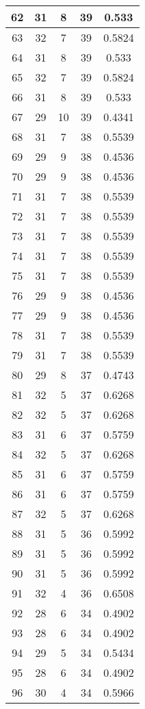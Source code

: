 \documentclass[letterpaper, 12pt]{article}
\begin{document}
\begin{longtable}{|c|c|c|c|c|}
\hline
62 & 31 & 8 & 39 & 0.533 \\
\hline
63 & 32 & 7 & 39 & 0.5824 \\
\hline
64 & 31 & 8 & 39 & 0.533 \\
\hline
65 & 32 & 7 & 39 & 0.5824 \\
\hline
66 & 31 & 8 & 39 & 0.533 \\
\hline
67 & 29 & 10 & 39 & 0.4341 \\
\hline
68 & 31 & 7 & 38 & 0.5539 \\
\hline
69 & 29 & 9 & 38 & 0.4536 \\
\hline
70 & 29 & 9 & 38 & 0.4536 \\
\hline
71 & 31 & 7 & 38 & 0.5539 \\
\hline
72 & 31 & 7 & 38 & 0.5539 \\
\hline
73 & 31 & 7 & 38 & 0.5539 \\
\hline
74 & 31 & 7 & 38 & 0.5539 \\
\hline
75 & 31 & 7 & 38 & 0.5539 \\
\hline
76 & 29 & 9 & 38 & 0.4536 \\
\hline
77 & 29 & 9 & 38 & 0.4536 \\
\hline
78 & 31 & 7 & 38 & 0.5539 \\
\hline
79 & 31 & 7 & 38 & 0.5539 \\
\hline
80 & 29 & 8 & 37 & 0.4743 \\
\hline
81 & 32 & 5 & 37 & 0.6268 \\
\hline
82 & 32 & 5 & 37 & 0.6268 \\
\hline
83 & 31 & 6 & 37 & 0.5759 \\
\hline
84 & 32 & 5 & 37 & 0.6268 \\
\hline
85 & 31 & 6 & 37 & 0.5759 \\
\hline
86 & 31 & 6 & 37 & 0.5759 \\
\hline
87 & 32 & 5 & 37 & 0.6268 \\
\hline
88 & 31 & 5 & 36 & 0.5992 \\
\hline
89 & 31 & 5 & 36 & 0.5992 \\
\hline
90 & 31 & 5 & 36 & 0.5992 \\
\hline
91 & 32 & 4 & 36 & 0.6508 \\
\hline
92 & 28 & 6 & 34 & 0.4902 \\
\hline
93 & 28 & 6 & 34 & 0.4902 \\
\hline
94 & 29 & 5 & 34 & 0.5434 \\
\hline
95 & 28 & 6 & 34 & 0.4902 \\
\hline
96 & 30 & 4 & 34 & 0.5966 \\

\end{longtable}
\end{document}
